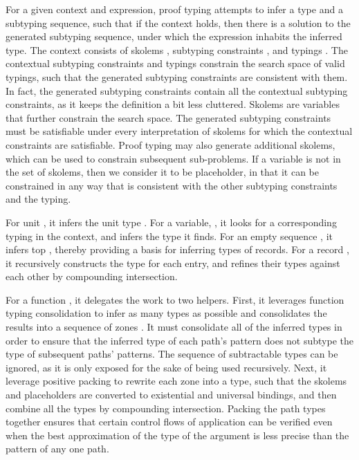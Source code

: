 \documentclass[table,dvipsnames,acmsmall]{acmart}
\theoremstyle{definition}
\begin{document}
\noindent
For a given context and expression, 
proof typing attempts to infer a type and a subtyping sequence,
such that if the context holds,
then there is a solution to the generated subtyping sequence, under which 
the expression inhabits the inferred type.
The context consists of skolems \ms{\Theta}, subtyping constraints \ms{\Delta}, and typings \ms{\Gamma}. 
The contextual subtyping constraints and typings constrain the search space of valid typings, 
such that the generated subtyping constraints are consistent with them. 
In fact, the generated subtyping constraints contain
all the contextual subtyping constraints, as it keeps the definition a bit less cluttered.
Skolems are variables that further constrain the search space. 
The generated subtyping constraints must be satisfiable under every interpretation of
skolems for which the contextual constraints are satisfiable.  
Proof typing may also generate additional skolems, which can be used to constrain
subsequent sub-problems.
If a variable is not in the set of skolems, then we consider it to be placeholder,
in that it can be constrained in any way that is consistent with the other subtyping constraints
and the typing. 



\noindent
For unit , it infers the unit type . 
For a variable, , it looks for a corresponding typing in the context, 
and infers the type it finds.
For an empty sequence \ms{\epsilon}, 
it infers top ,
thereby providing a basis for inferring types of records. 
For a record ,  
it recursively constructs the type for each entry, and
refines their types against each other by compounding intersection.

For a function ,  
it delegates the work to two helpers. 
First, it leverages function typing consolidation 
to infer as many types as possible
and consolidates the results into a sequence of zones \ms{\Pi}.
It must consolidate all of the inferred types in order to
ensure that the inferred type of each 
path's pattern does not subtype the type of subsequent paths' patterns. 
The sequence of subtractable types \ms{\Xi} can be ignored, as it is only
exposed for the sake of being used recursively.
Next, it leverage positive packing 
to rewrite each zone into a type,
such that the skolems and placeholders are converted to
existential and universal bindings,
and then combine all the types by compounding intersection.
Packing the path types together ensures that certain
control flows of application can be verified even when  
the best approximation of the type of the argument
is less precise than the pattern of any one path.
\end{document}
